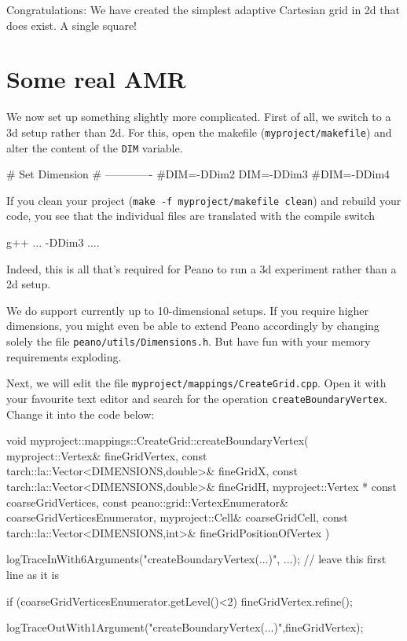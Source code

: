 \noindent
Congratulations: We have created the simplest adaptive Cartesian grid in 2d that
does exist. A single square!


\section{Some real AMR}

We now set up something slightly more complicated. 
First of all, we switch to a 3d setup rather than 2d. 
For this, open the makefile (\texttt{myproject/makefile}) and alter the
content of the \texttt{DIM} variable.

\begin{code}
# Set Dimension
# -------------
#DIM=-DDim2
DIM=-DDim3
#DIM=-DDim4
\end{code}

\noindent
If you clean your project (\texttt{make -f myproject/makefile clean}) and
rebuild your code, you see that the individual files are translated with the
compile switch 

\begin{code}
g++ ... -DDim3 ....
\end{code}

\noindent
Indeed, this is all that's required for Peano to run a 3d experiment rather than
a 2d setup. 

\begin{remark}
We do support currently up to 10-dimensional setups. If you require higher
dimensions, you might even be able to extend Peano accordingly by changing
solely the file \texttt{peano/utils/Dimensions.h}. But have fun with your memory
requirements exploding.
\end{remark}


Next, we will edit the file \texttt{myproject/mappings/CreateGrid.cpp}. 
Open it with your favourite text editor and search for the operation
\texttt{createBoundaryVertex}. 
Change it into the code below:


\begin{code}
void myproject::mappings::CreateGrid::createBoundaryVertex(
 myproject::Vertex&                          fineGridVertex,
 const tarch::la::Vector<DIMENSIONS,double>& fineGridX,
 const tarch::la::Vector<DIMENSIONS,double>& fineGridH,
 myproject::Vertex * const                   coarseGridVertices,
 const peano::grid::VertexEnumerator&     coarseGridVerticesEnumerator,
 myproject::Cell&                            coarseGridCell,
 const tarch::la::Vector<DIMENSIONS,int>&    fineGridPositionOfVertex
) {
  logTraceInWith6Arguments("createBoundaryVertex(...)", ...); 
    // leave this first line as it is
   
  if (coarseGridVerticesEnumerator.getLevel()<2) {
    fineGridVertex.refine();
  }

  logTraceOutWith1Argument("createBoundaryVertex(...)",fineGridVertex);
}
\end{code}


